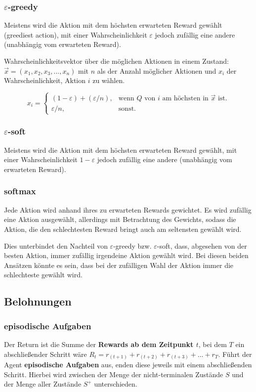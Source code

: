 \documentclass[10pt]{scrartcl}
\begin{document}
\subsubsection{$\varepsilon$-greedy}
Meistens wird die Aktion mit dem höchsten erwarteten Reward gewählt (greediest action), mit einer Wahrscheinlichkeit $\varepsilon$ jedoch zufällig eine andere (unabhängig vom erwarteten Reward).

Wahrscheinlichkeitsvektor über die möglichen Aktionen in einem Zustand: $\vec x = (x_1, x_2, x_3, ..., x_n)$ mit $n$ als der Anzahl möglicher Aktionen und $x_i$ der Wahrscheinlichkeit, Aktion $i$ zu wählen.

\[
x_i=\begin{cases}
  (1-\varepsilon) + (\varepsilon/n),  & \text{wenn }Q\text{ von }i\text{ am höchsten in }\vec x\text{ ist.}\\
  \varepsilon/n, & \text{sonst.}
\end{cases}
\]

\subsubsection{$\varepsilon$-soft}
Meistens wird die Aktion mit dem höchsten erwarteten Reward gewählt, mit einer Wahrscheinlichkeit $1-\varepsilon$ jedoch zufällig eine andere (unabhängig vom erwarteten Reward).

\subsubsection{softmax}
Jede Aktion wird anhand ihres zu erwarteten Rewards gewichtet. Es wird zufällig eine Aktion ausgewählt, allerdings mit Betrachtung des Gewichts, sodass die Aktion, die den schlechtesten Reward bringt auch am seltensten gewählt wird. 

Dies unterbindet den Nachteil von $\varepsilon$-greedy bzw. $\varepsilon$-soft, dass, abgesehen von der besten Aktion, immer zufällig irgendeine Aktion gewählt wird. Bei diesen beiden Ansätzen könnte es sein, dass bei der zufälligen Wahl der Aktion immer die schlechteste gewählt wird.

\subsection{Belohnungen}
\subsubsection{episodische Aufgaben}
Der Return ist die Summe der \textbf{Rewards ab dem Zeitpunkt $t$}, bei dem $T$ ein abschließender Schritt wäre  $R_{t}= r_{(t+1)}+ r_{(t+2)}+ r_{(t+3)}+ ... +r_{T}$. Führt der Agent \textbf{episodische Aufgaben} aus, enden diese jeweils mit einem abschließenden Schritt. Hierbei wird zwischen der Menge der nicht-terminalen Zustände $S$ und der Menge aller Zustände $S^{+}$ unterschieden.
\end{document}
